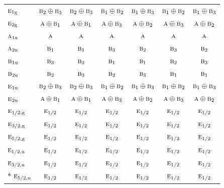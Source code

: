 \documentclass[10pt,a4paper]{article}
\numberwithin{equation}{section}
\newcommand{\irr}[1]{\text{\normalfont\scshape #1}}
\newcommand{\ptag}[1]{\mathrm{#1}}
\begin{document}
{\begin{longtable}{@{}lcccccc@{}}
$\irr{e}_{1\ptag{g}}$ & $\irr{b}_{2}\oplus \irr{b}_{3}$ & $\irr{b}_{2}\oplus \irr{b}_{3}$ & $\irr{b}_{1}\oplus \irr{b}_{2}$ & $\irr{b}_{1}\oplus \irr{b}_{3}$ & $\irr{b}_{1}\oplus \irr{b}_{2}$ & $\irr{b}_{1}\oplus \irr{b}_{3}$\\
$\irr{e}_{2\ptag{g}}$ & $\irr{a}\oplus \irr{b}_{1}$ & $\irr{a}\oplus \irr{b}_{1}$ & $\irr{a}\oplus \irr{b}_{3}$ & $\irr{a}\oplus \irr{b}_{2}$ & $\irr{a}\oplus \irr{b}_{3}$ & $\irr{a}\oplus \irr{b}_{2}$\\
$\irr{a}_{1\ptag{u}}$ & $\irr{a}$ & $\irr{a}$ & $\irr{a}$ & $\irr{a}$ & $\irr{a}$ & $\irr{a}$\\
$\irr{a}_{2\ptag{u}}$ & $\irr{b}_{1}$ & $\irr{b}_{1}$ & $\irr{b}_{3}$ & $\irr{b}_{2}$ & $\irr{b}_{3}$ & $\irr{b}_{2}$\\
$\irr{b}_{1\ptag{u}}$ & $\irr{b}_{3}$ & $\irr{b}_{2}$ & $\irr{b}_{1}$ & $\irr{b}_{1}$ & $\irr{b}_{2}$ & $\irr{b}_{3}$\\
$\irr{b}_{2\ptag{u}}$ & $\irr{b}_{2}$ & $\irr{b}_{3}$ & $\irr{b}_{2}$ & $\irr{b}_{3}$ & $\irr{b}_{1}$ & $\irr{b}_{1}$\\
$\irr{e}_{1\ptag{u}}$ & $\irr{b}_{2}\oplus \irr{b}_{3}$ & $\irr{b}_{2}\oplus \irr{b}_{3}$ & $\irr{b}_{1}\oplus \irr{b}_{2}$ & $\irr{b}_{1}\oplus \irr{b}_{3}$ & $\irr{b}_{1}\oplus \irr{b}_{2}$ & $\irr{b}_{1}\oplus \irr{b}_{3}$\\
$\irr{e}_{2\ptag{u}}$ & $\irr{a}\oplus \irr{b}_{1}$ & $\irr{a}\oplus \irr{b}_{1}$ & $\irr{a}\oplus \irr{b}_{3}$ & $\irr{a}\oplus \irr{b}_{2}$ & $\irr{a}\oplus \irr{b}_{3}$ & $\irr{a}\oplus \irr{b}_{2}$\\
$\irr{e}_{1/2,\ptag{g}}$ & $\irr{e}_{1/2}$ & $\irr{e}_{1/2}$ & $\irr{e}_{1/2}$ & $\irr{e}_{1/2}$ & $\irr{e}_{1/2}$ & $\irr{e}_{1/2}$\\
$\irr{e}_{3/2,\ptag{g}}$ & $\irr{e}_{1/2}$ & $\irr{e}_{1/2}$ & $\irr{e}_{1/2}$ & $\irr{e}_{1/2}$ & $\irr{e}_{1/2}$ & $\irr{e}_{1/2}$\\
$\irr{e}_{5/2,\ptag{g}}$ & $\irr{e}_{1/2}$ & $\irr{e}_{1/2}$ & $\irr{e}_{1/2}$ & $\irr{e}_{1/2}$ & $\irr{e}_{1/2}$ & $\irr{e}_{1/2}$\\
$\irr{e}_{1/2,\ptag{u}}$ & $\irr{e}_{1/2}$ & $\irr{e}_{1/2}$ & $\irr{e}_{1/2}$ & $\irr{e}_{1/2}$ & $\irr{e}_{1/2}$ & $\irr{e}_{1/2}$\\
$\irr{e}_{3/2,\ptag{u}}$ & $\irr{e}_{1/2}$ & $\irr{e}_{1/2}$ & $\irr{e}_{1/2}$ & $\irr{e}_{1/2}$ & $\irr{e}_{1/2}$ & $\irr{e}_{1/2}$\\*
$\irr{e}_{5/2,\ptag{u}}$ & $\irr{e}_{1/2}$ & $\irr{e}_{1/2}$ & $\irr{e}_{1/2}$ & $\irr{e}_{1/2}$ & $\irr{e}_{1/2}$ & $\irr{e}_{1/2}$\\
\bottomrule\end{longtable}}
\end{document}

